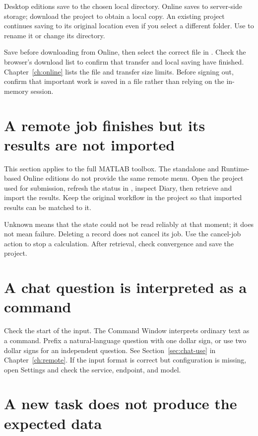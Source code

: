 Desktop editions save to the chosen local directory. Online saves to server-side storage; download the project to obtain a local copy. An existing project continues saving to its original location even if you select a different folder. Use  to rename it or change its directory.

Save before downloading from Online, then select the correct  file in . Check the browser's download list to confirm that transfer and local saving have finished. Chapter~\ref{ch:online} lists the file and transfer size limits. Before signing out, confirm that important work is saved in a file rather than relying on the in-memory session.

\section{A remote job finishes but its results are not imported}

This section applies to the full MATLAB\regmark{} toolbox. The standalone and Runtime-based Online editions do not provide the same remote menu. Open the project used for submission, refresh the status in , inspect Diary, then retrieve and import the results. Keep the original workflow in the project so that imported results can be matched to it.

Unknown means that the state could not be read reliably at that moment; it does not mean failure. Deleting a record does not cancel its job. Use the cancel-job action to stop a calculation. After retrieval, check convergence and save the project.

\section{A chat question is interpreted as a command}

Check the start of the input. The Command Window interprets ordinary text as a command. Prefix a natural-language question with one dollar sign, or use two dollar signs for an independent question. See Section~\ref{sec:chat-use} in Chapter~\ref{ch:remote}. If the input format is correct but configuration is missing, open Settings and check the service, endpoint, and model.

\section{A new task does not produce the expected data}

